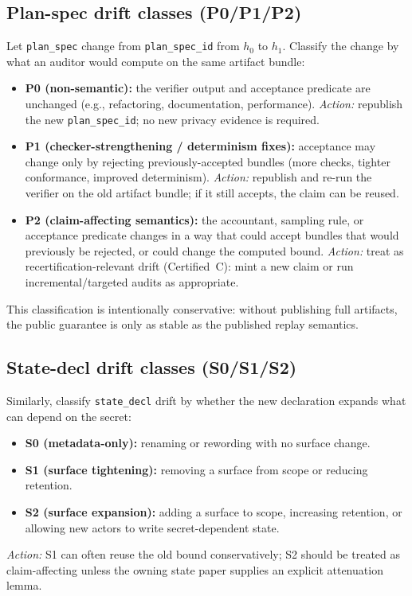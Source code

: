 \documentclass[11pt]{article}
\begin{document}
\subsection*{Plan-spec drift classes (P0/P1/P2)}
Let \texttt{plan\_spec} change from \texttt{plan\_spec\_id} from $h_0$ to $h_1$.
Classify the change by what an auditor would compute on the same artifact bundle:
\begin{itemize}[leftmargin=*]
\item \textbf{P0 (non-semantic):} the verifier output and acceptance predicate are unchanged (e.g., refactoring, documentation, performance).
\emph{Action:} republish the new \texttt{plan\_spec\_id}; no new privacy evidence is required.
\item \textbf{P1 (checker-strengthening / determinism fixes):} acceptance may change only by rejecting previously-accepted bundles (more checks, tighter conformance, improved determinism).
\emph{Action:} republish and re-run the verifier on the old artifact bundle; if it still accepts, the claim can be reused.
\item \textbf{P2 (claim-affecting semantics):} the accountant, sampling rule, or acceptance predicate changes in a way that could accept bundles that would previously be rejected, or could change the computed bound.
\emph{Action:} treat as recertification-relevant drift (Certified~C): mint a new claim or run incremental/targeted audits as appropriate.\cite{series:recert}
\end{itemize}
This classification is intentionally conservative: without publishing full artifacts, the public guarantee is only as stable as the published replay semantics.

\subsection*{State-decl drift classes (S0/S1/S2)}
Similarly, classify \texttt{state\_decl} drift by whether the new declaration expands what can depend on the secret:
\begin{itemize}[leftmargin=*]
\item \textbf{S0 (metadata-only):} renaming or rewording with no surface change.
\item \textbf{S1 (surface tightening):} removing a surface from scope or reducing retention.
\item \textbf{S2 (surface expansion):} adding a surface to scope, increasing retention, or allowing new actors to write secret-dependent state.
\end{itemize}
\emph{Action:} S1 can often reuse the old bound conservatively; S2 should be treated as claim-affecting unless the owning state paper supplies an explicit attenuation lemma.
\end{document}
